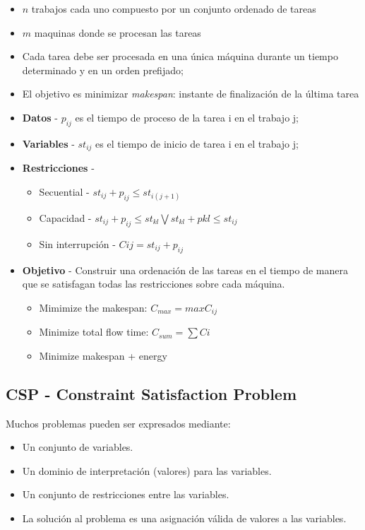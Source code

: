 \begin{paracol}{2}
   \colfill
   \begin{itemize}
      \item $n$ trabajos cada uno compuesto por un conjunto ordenado de tareas
      \item $m$ maquinas donde se procesan las tareas
      \item Cada tarea debe ser procesada en una única máquina durante un tiempo determinado y en un orden prefijado;
      \item El objetivo es minimizar \textit{makespan}: instante de finalización de la última tarea
   \end{itemize}
   \colfill
   \switchcolumn

   \begin{itemize}
      \item \textbf{Datos} - $p_{ij}$ es el tiempo de proceso de la tarea i en el trabajo j;
      \item \textbf{Variables} - $st_{ij}$ es el tiempo de inicio de tarea i en el trabajo j;
      \item \textbf{Restricciones} -
      \begin{itemize}
         \item Secuential - $st_{ij} + p_{ij} \leq st_{i(j+1)}$
         \item Capacidad - $st_{ij} + p_{ij} \leq st_{kl} \bigvee st_{kl} + pkl \leq st_{ij}$
         \item Sin interrupción - $Cij = st_{ij} + p_{ij}$
      \end{itemize}
      \item \textbf{Objetivo} - Construir una ordenación de las tareas en el tiempo de manera que
      se satisfagan todas las restricciones sobre cada máquina.

      \begin{itemize}
         \item Mimimize the makespan: $C_{max} = max C_{ij}$
         \item Minimize total flow time: $C_{sum} = \sum C{i}$
         \item Minimize makespan + energy
      \end{itemize}
   \end{itemize}

\end{paracol}

\subsection{CSP - Constraint Satisfaction Problem}
{Muchos problemas pueden ser expresados mediante:\ns
\begin{itemize}
	\item Un conjunto de variables.
	\item Un dominio de interpretación (valores) para las variables.
	\item Un conjunto de restricciones entre las variables.
   \item La solución al problema es una asignación válida de valores a las variables.
\end{itemize}}

